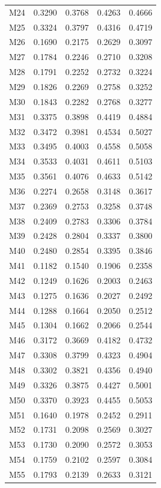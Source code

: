 \begin{longtable}{lrrrr}
M24 & 0.3290 & 0.3768 & 0.4263 & 0.4666 \\
M25 & 0.3324 & 0.3797 & 0.4316 & 0.4719 \\
M26 & 0.1690 & 0.2175 & 0.2629 & 0.3097 \\
M27 & 0.1784 & 0.2246 & 0.2710 & 0.3208 \\
M28 & 0.1791 & 0.2252 & 0.2732 & 0.3224 \\
M29 & 0.1826 & 0.2269 & 0.2758 & 0.3252 \\
M30 & 0.1843 & 0.2282 & 0.2768 & 0.3277 \\
M31 & 0.3375 & 0.3898 & 0.4419 & 0.4884 \\
M32 & 0.3472 & 0.3981 & 0.4534 & 0.5027 \\
M33 & 0.3495 & 0.4003 & 0.4558 & 0.5058 \\
M34 & 0.3533 & 0.4031 & 0.4611 & 0.5103 \\
M35 & 0.3561 & 0.4076 & 0.4633 & 0.5142 \\
M36 & 0.2274 & 0.2658 & 0.3148 & 0.3617 \\
M37 & 0.2369 & 0.2753 & 0.3258 & 0.3748 \\
M38 & 0.2409 & 0.2783 & 0.3306 & 0.3784 \\
M39 & 0.2428 & 0.2804 & 0.3337 & 0.3800 \\
M40 & 0.2480 & 0.2854 & 0.3395 & 0.3846 \\
M41 & 0.1182 & 0.1540 & 0.1906 & 0.2358 \\
M42 & 0.1249 & 0.1626 & 0.2003 & 0.2463 \\
M43 & 0.1275 & 0.1636 & 0.2027 & 0.2492 \\
M44 & 0.1288 & 0.1664 & 0.2050 & 0.2512 \\
M45 & 0.1304 & 0.1662 & 0.2066 & 0.2544 \\
M46 & 0.3172 & 0.3669 & 0.4182 & 0.4732 \\
M47 & 0.3308 & 0.3799 & 0.4323 & 0.4904 \\
M48 & 0.3302 & 0.3821 & 0.4356 & 0.4940 \\
M49 & 0.3326 & 0.3875 & 0.4427 & 0.5001 \\
M50 & 0.3370 & 0.3923 & 0.4455 & 0.5053 \\
M51 & 0.1640 & 0.1978 & 0.2452 & 0.2911 \\
M52 & 0.1731 & 0.2098 & 0.2569 & 0.3027 \\
M53 & 0.1730 & 0.2090 & 0.2572 & 0.3053 \\
M54 & 0.1759 & 0.2102 & 0.2597 & 0.3084 \\
M55 & 0.1793 & 0.2139 & 0.2633 & 0.3121 \\

\end{longtable}
